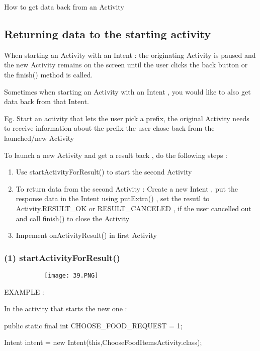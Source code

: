 \documentclass{article}
\begin{document}
How to get data back from an Activity

\subsection{Returning data to the starting activity}

When starting an Activity with an Intent : the originating Activity is paused and the new Activity remains on the screen until the user clicks the back button or the finish() method is called.

Sometimes when starting an Activity with an Intent , you would like to also get data back from that Intent.

Eg. Start an activity that lets the user pick a prefix, the original Activity needs to receive information about the prefix the user chose back from the launched/new Activity

To launch a new Activity and get a result back , do the following steps : 

\begin{enumerate}
    \item Use startActivityForResult() to start the second Activity
    \item To return data from the second Activity : Create a new Intent , put the response data in the Intent using putExtra()
, set the resutl to Activity.RESULT\_OK or RESULT\_CANCELED , if the user cancelled out and call finish() to close the Activity
    \item Impement onActivityResult() in first Activity
\end{enumerate}

\subsubsection{ (1) startActivityForResult()}

\begin{figure}[ht!]
  \centering
  \begin{subfigure}[b]{0.8\linewidth}
    \texttt{[image: 39.PNG]}
  \end{subfigure}
  \end{figure}

EXAMPLE :

In the activity that starts the new one :

public static final int CHOOSE\_FOOD\_REQUEST = 1;

Intent intent = new Intent(this,ChooseFoodItemsActivity.class);
\end{document}
